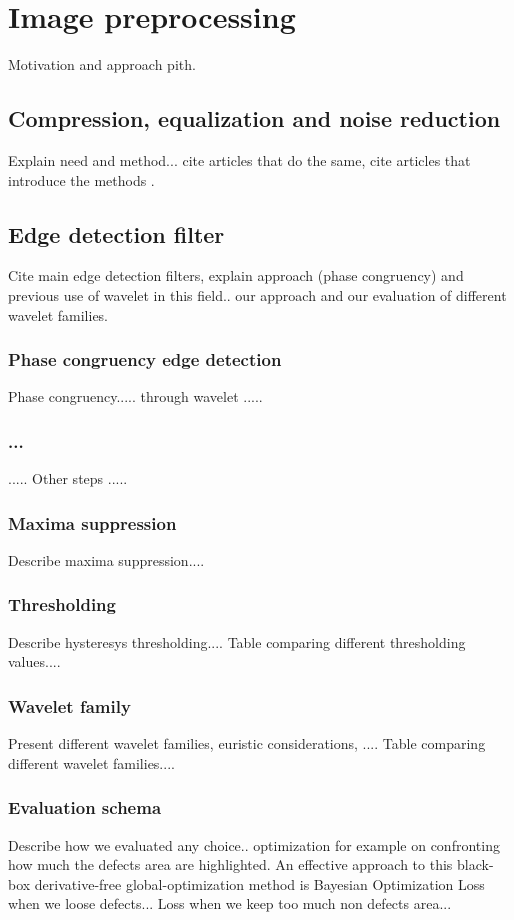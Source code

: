 \section{Image preprocessing}
    Motivation and approach pith.
    
    \subsection{Compression, equalization and noise reduction}
        Explain need and method... cite articles that do the same, cite articles that introduce the methods \cite{Klette:2014:CCV:2584519}.

    \subsection{Edge detection filter}
        Cite main edge detection filters, explain approach (phase congruency) and previous use of wavelet in this field.. our approach and our evaluation of different wavelet families.
        \subsubsection{Phase congruency edge detection}
            Phase congruency.....  through wavelet .....
        \subsubsection{...}
            ..... Other steps .....
        \subsubsection{Maxima suppression}
            Describe maxima suppression....
        \subsubsection{Thresholding}
            Describe hysteresys thresholding....
            Table comparing different thresholding values....
        \subsubsection{Wavelet family}
            Present different wavelet families, euristic considerations, ....
            Table comparing different wavelet families....
        \subsubsection{Evaluation schema}
            Describe how we evaluated any choice.. optimization for example on confronting how much the defects area are highlighted.
            An effective approach to this black-box derivative-free global-optimization method is Bayesian Optimization \cite{rasmussen:williams:2006, arXiv:2018arXiv180702811F, arXiv:2012arXiv1206.2944S}
            Loss when we loose defects...
            Loss when we keep too much non defects area...